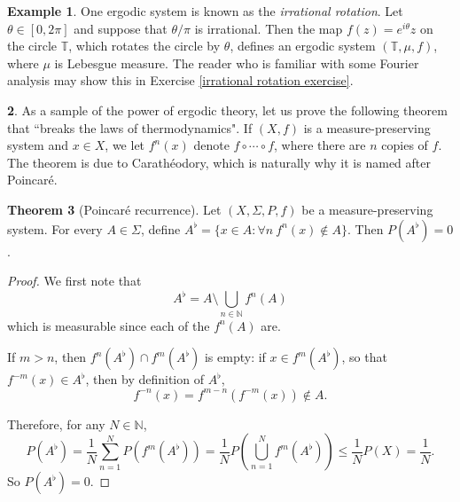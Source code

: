 \documentclass[12pt]{book}
\newcommand{\NN}{\mathbb{N}}
\newcommand{\Torus}{\mathbb{T}}
\newcommand{\dfn}[1]{\emph{#1}\index{#1}}
\theoremstyle{definition}
\newtheorem{theorem}{Theorem}[section]
\newtheorem{subsec}[theorem]{}
\newtheorem{example}[theorem]{Example}
\begin{document}
\begin{example}
One ergodic system is known as the \dfn{irrational rotation}.
Let $\theta \in [0, 2\pi]$ and suppose that $\theta/\pi$ is irrational.
Then the map $f(z) = e^{i\theta}z$ on the circle $\Torus$, which rotates the circle by $\theta$, defines an ergodic system $(\Torus, \mu, f)$, where $\mu$ is Lebesgue measure.
The reader who is familiar with some Fourier analysis may show this in Exercise \ref{irrational rotation exercise}.
\end{example}

\begin{subsec}
As a sample of the power of ergodic theory, let us prove the following theorem that ``breaks the laws of thermodynamics".
If $(X, f)$ is a measure-preserving system and $x \in X$, we let $f^n(x)$ denote $f \circ \cdots \circ f$, where there are $n$ copies of $f$.
The theorem is due to Carathéodory, which is naturally why it is named after Poincar\'e.
\end{subsec}

\begin{theorem}[Poincar\'e recurrence]
Let $(X, \Sigma, P, f)$ be a measure-preserving system.
For every $A \in \Sigma$, define $A^\flat = \{x \in A: \forall n~f^n(x) \notin A\}$.
Then $P(A^\flat) = 0$.
\end{theorem}
\begin{proof}
We first note that
$$A^\flat = A \setminus \bigcup_{n \in \NN} f^n(A)$$
which is measurable since each of the $f^n(A)$ are.

If $m > n$, then $f^n(A^\flat) \cap f^m(A^\flat)$ is empty: if $x \in f^m(A^\flat)$, so that $f^{-m}(x) \in A^\flat$, then by definition of $A^\flat$,
$$f^{-n}(x) = f^{m-n}(f^{-m}(x)) \notin A.$$

Therefore, for any $N \in \NN$,
$$P(A^\flat) = \frac{1}{N} \sum_{n=1}^N P(f^m(A^\flat)) = \frac{1}{N} P\left(\bigcup_{n=1}^N f^m(A^\flat)\right) \leq \frac{1}{N} P(X) = \frac{1}{N}.$$
So $P(A^\flat) = 0$.
\end{proof}
\end{document}
